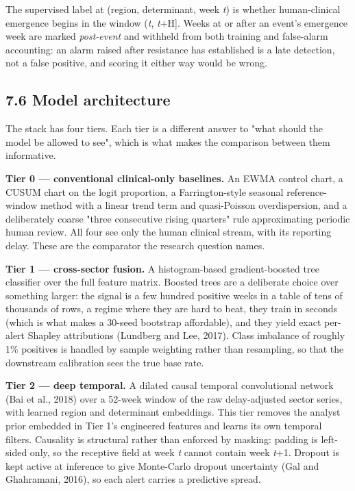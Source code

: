 \documentclass[11pt,a4paper]{article}
\begin{document}
The supervised label at (region, determinant, week \emph{t}) is whether human-clinical emergence begins in the window (\emph{t}, \emph{t}+H]. Weeks at or after an event's emergence week are marked \emph{post-event} and withheld from both training and false-alarm accounting: an alarm raised after resistance has established is a late detection, not a false positive, and scoring it either way would be wrong.

\subsection*{7.6 Model architecture}

The stack has four tiers. Each tier is a different answer to "what should the model be allowed to see", which is what makes the comparison between them informative.

\textbf{Tier 0 — conventional clinical-only baselines.} An EWMA control chart, a CUSUM chart on the logit proportion, a Farrington-style seasonal reference-window method with a linear trend term and quasi-Poisson overdispersion, and a deliberately coarse "three consecutive rising quarters" rule approximating periodic human review. All four see only the human clinical stream, with its reporting delay. These are the comparator the research question names.

\textbf{Tier 1 — cross-sector fusion.} A histogram-based gradient-boosted tree classifier over the full feature matrix. Boosted trees are a deliberate choice over something larger: the signal is a few hundred positive weeks in a table of tens of thousands of rows, a regime where they are hard to beat, they train in seconds (which is what makes a 30-seed bootstrap affordable), and they yield exact per-alert Shapley attributions (Lundberg and Lee, 2017). Class imbalance of roughly 1\% positives is handled by sample weighting rather than resampling, so that the downstream calibration sees the true base rate.

\textbf{Tier 2 — deep temporal.} A dilated causal temporal convolutional network (Bai et al., 2018) over a 52-week window of the raw delay-adjusted sector series, with learned region and determinant embeddings. This tier removes the analyst prior embedded in Tier 1's engineered features and learns its own temporal filters. Causality is structural rather than enforced by masking: padding is left-sided only, so the receptive field at week \emph{t} cannot contain week \emph{t}+1. Dropout is kept active at inference to give Monte-Carlo dropout uncertainty (Gal and Ghahramani, 2016), so each alert carries a predictive spread.
\end{document}

